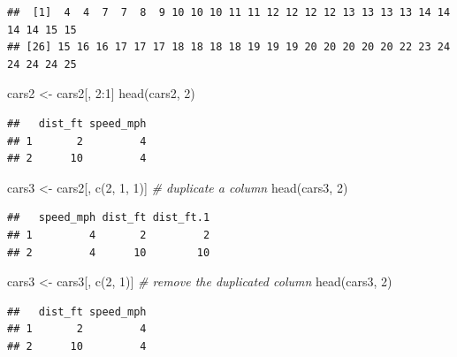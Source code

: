 \documentclass[
  11pt,
  a4paper,
]{book}
\newenvironment{Shaded}{\begin{snugshade}}{\end{snugshade}}
\newcommand{\CommentTok}[1]{\textcolor[rgb]{0.56,0.35,0.01}{\textit{#1}}}
\newcommand{\DecValTok}[1]{\textcolor[rgb]{0.00,0.00,0.81}{#1}}
\newcommand{\FunctionTok}[1]{\textcolor[rgb]{0.00,0.00,0.00}{#1}}
\newcommand{\NormalTok}[1]{#1}
\newcommand{\OtherTok}[1]{\textcolor[rgb]{0.56,0.35,0.01}{#1}}
\newcommand{\SpecialCharTok}[1]{\textcolor[rgb]{0.00,0.00,0.00}{#1}}
\begin{document}
\begin{verbatim}
##  [1]  4  4  7  7  8  9 10 10 10 11 11 12 12 12 12 13 13 13 13 14 14 14 14 15 15
## [26] 15 16 16 17 17 17 18 18 18 18 19 19 19 20 20 20 20 20 22 23 24 24 24 24 25
\end{verbatim}

\begin{Shaded}
\begin{Highlighting}[]
\NormalTok{cars2 }\OtherTok{\textless{}{-}}\NormalTok{ cars2[, }\DecValTok{2}\SpecialCharTok{:}\DecValTok{1}\NormalTok{] }
\FunctionTok{head}\NormalTok{(cars2, }\DecValTok{2}\NormalTok{) }
\end{Highlighting}
\end{Shaded}

\begin{verbatim}
##   dist_ft speed_mph
## 1       2         4
## 2      10         4
\end{verbatim}

\begin{Shaded}
\begin{Highlighting}[]
\NormalTok{cars3 }\OtherTok{\textless{}{-}}\NormalTok{ cars2[, }\FunctionTok{c}\NormalTok{(}\DecValTok{2}\NormalTok{, }\DecValTok{1}\NormalTok{, }\DecValTok{1}\NormalTok{)] }\CommentTok{\# duplicate a column}
\FunctionTok{head}\NormalTok{(cars3, }\DecValTok{2}\NormalTok{)}
\end{Highlighting}
\end{Shaded}

\begin{verbatim}
##   speed_mph dist_ft dist_ft.1
## 1         4       2         2
## 2         4      10        10
\end{verbatim}

\begin{Shaded}
\begin{Highlighting}[]
\NormalTok{cars3 }\OtherTok{\textless{}{-}}\NormalTok{ cars3[, }\FunctionTok{c}\NormalTok{(}\DecValTok{2}\NormalTok{, }\DecValTok{1}\NormalTok{)] }\CommentTok{\# remove the duplicated column}
\FunctionTok{head}\NormalTok{(cars3, }\DecValTok{2}\NormalTok{)}
\end{Highlighting}
\end{Shaded}

\begin{verbatim}
##   dist_ft speed_mph
## 1       2         4
## 2      10         4
\end{verbatim}

\begin{Shaded}
\end{Shaded}
\end{document}
